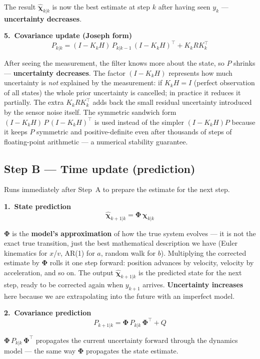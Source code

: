 \documentclass[12pt, a4paper]{article}
\begin{document}
The result $\hat{\boldsymbol{\chi}}_{k|k}$ is now the best estimate
at step $k$ after having seen $y_k$ --- \textbf{uncertainty decreases}.

\medskip
\textbf{5.\ Covariance update (Joseph form)}
\[
  P_{k|k} = (I - K_k H)\,P_{k|k-1}\,(I - K_k H)^\top + K_k R K_k^\top
\]

After seeing the measurement, the filter knows more about the state,
so $P$ shrinks --- \textbf{uncertainty decreases}.
The factor $(I - K_k H)$ represents how much uncertainty is
\emph{not} explained by the measurement: if $K_k H = I$ (perfect
observation of all states) the whole prior uncertainty is cancelled;
in practice it reduces it partially.
The extra $K_k R K_k^\top$ adds back the small residual uncertainty
introduced by the sensor noise itself.
The symmetric sandwich form $(I-K_kH)\,P\,(I-K_kH)^\top$ is used
instead of the simpler $(I-K_kH)P$ because it keeps $P$ symmetric
and positive-definite even after thousands of steps of floating-point
arithmetic --- a numerical stability guarantee.

\subsection*{Step B --- Time update (prediction)}

Runs immediately after Step~A to prepare the estimate for the next step.

\medskip
\textbf{1.\ State prediction}
\[
  \hat{\boldsymbol{\chi}}_{k+1|k} = \boldsymbol{\Phi}\,\hat{\boldsymbol{\chi}}_{k|k}
\]

$\boldsymbol{\Phi}$ is the \textbf{model's approximation} of how the
true system evolves --- it is not the exact true transition, just the
best mathematical description we have (Euler kinematics for $x$/$v$,
AR(1) for $a$, random walk for $b$).
Multiplying the corrected estimate by $\boldsymbol{\Phi}$ rolls it
one step forward: position advances by velocity, velocity by
acceleration, and so on.
The output $\hat{\boldsymbol{\chi}}_{k+1|k}$ is the predicted state
for the next step, ready to be corrected again when $y_{k+1}$ arrives.
\textbf{Uncertainty increases} here because we are extrapolating
into the future with an imperfect model.

\medskip
\textbf{2.\ Covariance prediction}
\[
  P_{k+1|k} = \boldsymbol{\Phi}\,P_{k|k}\,\boldsymbol{\Phi}^\top + Q
\]

$\boldsymbol{\Phi}\,P_{k|k}\,\boldsymbol{\Phi}^\top$ propagates the
current uncertainty forward through the dynamics model --- the same way
$\boldsymbol{\Phi}$ propagates the state estimate.
\end{document}
